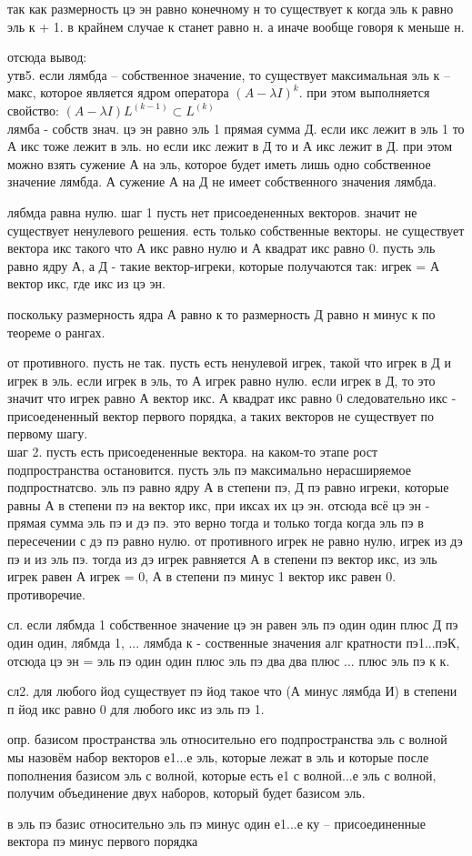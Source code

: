 \documentclass[12pt, a4paper]{article}
\begin{document}
так как размерность цэ эн равно конечному н то существует к когда эль к равно эль к + 1. в крайнем случае к станет равно н. а иначе вообще говоря к меньше н.

отсюда вывод:\\
утв5.
если лямбда -- собственное значение, то существует максимальная эль к -- макс, которое является ядром оператора $(A - \lambda I)^k$. при этом выполняется свойство: $(A - \lambda I)L^{(k-1)} \subset L^{(k)}$\\

лямба - собств знач. цэ эн равно эль 1 прямая сумма Д. если икс лежит в эль 1 то А икс тоже лежит в эль. но если икс  лежит в Д то и А икс лежит в Д. при этом можно взять сужение А на эль, которое будет иметь лишь одно собственное значение лямбда. А сужение А на Д не имеет собственного значения лямбда.

лябмда равна нулю. шаг 1 пусть нет присоедененных векторов. значит не существует ненулевого решения. есть только собственные векторы. не существует вектора икс такого что А икс равно нулю и А квадрат икс равно 0. пусть эль равно ядру А, а Д - такие вектор-игреки, которые получаются так: игрек = А вектор икс, где икс из цэ эн.

поскольку размерность ядра А равно к то размерность Д равно н минус к по теореме о рангах.

от противного. пусть не так. пусть есть ненулевой игрек, такой что игрек в Д и игрек в эль. 
если игрек в эль, то А игрек равно нулю. если игрек в Д, то это значит что игрек равно А вектор икс. А квадрат икс равно 0 следовательно икс - присоедененный вектор первого порядка, а таких векторов не существует по первому шагу.\\

шаг 2. пусть есть присоедененные вектора. на каком-то этапе рост подпространства остановится. пусть эль пэ максимально нерасширяемое подпростнатсво. эль пэ равно ядру А в степени пэ, Д пэ равно игреки, которые равны А в степени пэ на вектор икс, при иксах их цэ эн. отсюда всё цэ эн - прямая сумма эль пэ и дэ пэ. это верно тогда и только тогда когда эль пэ в пересечении с дэ пэ равно нулю. от противного игрек не равно нулю, игрек из дэ пэ и из эль пэ. тогда из дэ игрек равняется А в степени пэ вектор икс, из эль игрек равен А игрек = 0, А в степени пэ минус 1 вектор икс равен 0. противоречие. 

сл. если лябмда 1 собственное значение цэ эн равен эль пэ один один плюс Д пэ один один, лябмда 1, ... лямбда к - соственные значения алг кратности пэ1...пэК, отсюда цэ эн = эль пэ один один плюс эль пэ два два плюс ... плюс эль пэ к к.

сл2. для любого йод существует пэ йод такое что (А минус лямбда И) в степени п йод икс равно 0 для любого икс из эль пэ 1. 

опр. базисом пространства эль относительно его подпространства эль с волной мы назовём набор векторов е1...е эль, которые лежат в эль и которые после пополнения базисом эль с волной, которые есть е1 с волной...е эль с волной, получим объединение двух наборов, который будет базисом эль. 

в эль пэ базис относительно эль пэ минус один е1...е ку -- присоединенные вектора пэ минус первого порядка
\end{document}
